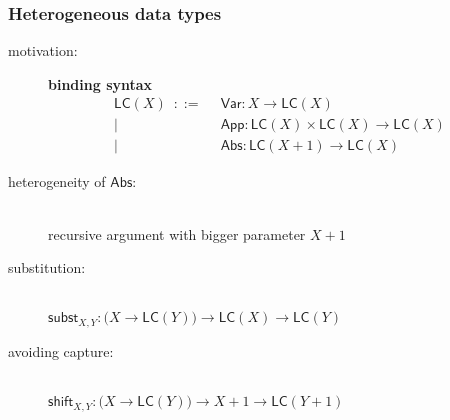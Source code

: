 \documentclass[
]
{beamer}
\newcommand{\constfont}[1]{\ensuremath{\mathsf{#1}}}
\newcommand{\shift}{\constfont{shift}}
\newcommand{\subst}{\constfont{subst}}
\newcommand{\App}{\constfont{App}}
\newcommand{\Abs}{\constfont{Abs}}
\newcommand{\Var}{\constfont{Var}}
\newcommand{\LC}{\mathsf{LC}}
\newcommand{\fat}[1]{\textbf{#1}}
\begin{document}
\begin{frame}
  \frametitle{Heterogeneous data types}

 
  \begin{description}
    \item [motivation:] \fat{binding syntax} 
           \begin{align*} \LC(X) \enspace ::=                                              
                                           \enspace  & \Var : X \to \LC(X) \\
                                           | \enspace  & \App : \LC(X)\times\LC(X)\to\LC(X) \\ 
                                           | \enspace &\Abs : \LC(X + 1) \to \LC(X) \enspace
           \end{align*}
    \item [heterogeneity of $\Abs$:] \hfill \\ recursive argument with bigger parameter $X+1$
    
    \item [substitution:] \hfill\\        
       $ \subst_{X,Y} : \bigl(X \to \LC (Y)\bigr) \to \LC (X) \to \LC (Y) $
    
    \item [avoiding capture:] \hfill \\ $\shift_{X,Y} : \bigl(X \to \LC(Y)\bigr) \to X+1 \to \LC(Y+1)$
    
  \end{description}
\end{frame}
\end{document}
